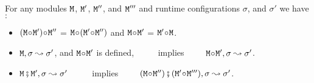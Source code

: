 \begin{lemma}
 For any modules $\M$,   $\M'$, $\M''$, and $\M'''$ and runtime configurations $\sigma$, and $\sigma'$ we have$:$
 \label{lemma:linking:properties}

 \begin{itemize}
     \item
     $(\M \link \M')\link \M''$ = $\M \link (\M' \link \M'')$  \hspace{1cm} and    \hspace{1cm}   $\M \link \M'$  = $\M' \link\M$.
      \item
      $\M, \sigma \leadsto \sigma'$, and $\M\link \M'$ is defined, \  \ \ \ \  implies\ \ \ \ \   $\M\link \M', \sigma \leadsto \sigma'$.
 \item
 $\M \mkpair \M', \sigma \leadsto \sigma'$   \  \ \ \ \  implies\ \ \ \ \  $(\M\link\M'') \mkpair (\M'\link\M''') ,\sigma \leadsto \sigma'$.  
  \end{itemize}

 \end{lemma}


